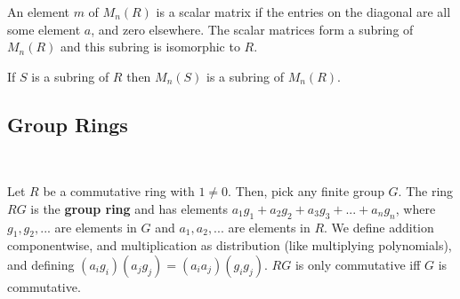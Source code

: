 \documentclass{article}
\begin{document}
An element $m$ of $M_n(R)$ is a scalar matrix if the entries on the diagonal are all some element $a$, and zero elsewhere. The scalar matrices form a subring of $M_n(R)$ and this subring is isomorphic to $R$. 

If $S$ is a subring of $R$ then $M_n(S)$ is a subring of $M_n(R)$.

\subsection{Group Rings}

\ 

\begin{definition}

Let $R$ be a commutative ring with $1 \neq 0$. Then, pick any finite group $G$. The ring $RG$ is the \textbf{group ring} and has elements $a_1g_1 + a_2g_2 + a_3g_3 + ... + a_ng_n$, where $g_1, g_2, ...$ are elements in $G$ and $a_1, a_2, ...$ are elements in $R$. We define addition componentwise, and multiplication as distribution (like multiplying polynomials), and defining $(a_ig_i)(a_jg_j) = (a_ia_j)(g_ig_j)$. $RG$ is only commutative iff $G$ is commutative. 

\end{definition}
\end{document}

